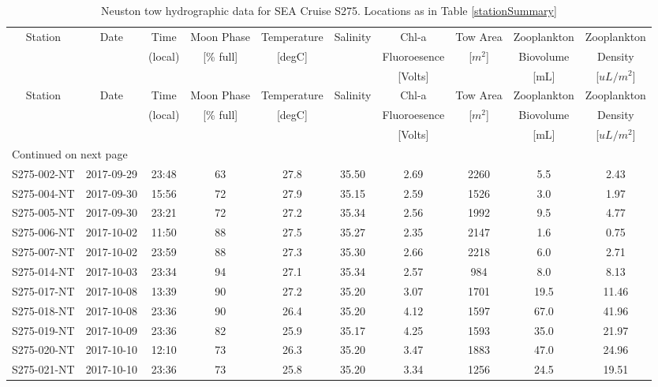 \begin{longtable}{cccccccccc}
\caption{\label{neuston1} Neuston tow hydrographic data for SEA Cruise S275. Locations as in Table \ref{stationSummary}} \\ 
 Station & Date & Time & Moon Phase & Temperature & Salinity & Chl-a & Tow Area & Zooplankton & Zooplankton \\ 
   &  & (local) & [\% full] & [degC] &  & Fluoroesence & [$m^2$] & Biovolume & Density \\ 
 &  &  &  &  &  & [Volts] &  & [mL] & [$uL/m^2$] \\ 
\hline\n\endfirsthead
Station & Date & Time & Moon Phase & Temperature & Salinity & Chl-a & Tow Area & Zooplankton & Zooplankton \\ 
 &  & (local) & [\% full] & [degC] &  & Fluoroesence & [$m^2$] & Biovolume & Density \\ 
 &  &  &  &  &  & [Volts] &  & [mL] & [$uL/m^2$] \\ 
\hline
\endhead
\hline
\multicolumn{10}{l}{\footnotesize Continued on next page}
\endfoot
\endlastfoot
 \hline
S275-001-NT & 2017-09-29 & 12:34 & 63 & 27.9 & 35.50 & 2.43 & 2439 & 2.0 & 0.82 \\ 
  S275-002-NT & 2017-09-29 & 23:48 & 63 & 27.8 & 35.50 & 2.69 & 2260 & 5.5 & 2.43 \\ 
  S275-004-NT & 2017-09-30 & 15:56 & 72 & 27.9 & 35.15 & 2.59 & 1526 & 3.0 & 1.97 \\ 
  S275-005-NT & 2017-09-30 & 23:21 & 72 & 27.2 & 35.34 & 2.56 & 1992 & 9.5 & 4.77 \\ 
  S275-006-NT & 2017-10-02 & 11:50 & 88 & 27.5 & 35.27 & 2.35 & 2147 & 1.6 & 0.75 \\ 
  S275-007-NT & 2017-10-02 & 23:59 & 88 & 27.3 & 35.30 & 2.66 & 2218 & 6.0 & 2.71 \\ 
  S275-014-NT & 2017-10-03 & 23:34 & 94 & 27.1 & 35.34 & 2.57 & 984 & 8.0 & 8.13 \\ 
  S275-017-NT & 2017-10-08 & 13:39 & 90 & 27.2 & 35.20 & 3.07 & 1701 & 19.5 & 11.46 \\ 
  S275-018-NT & 2017-10-08 & 23:36 & 90 & 26.4 & 35.20 & 4.12 & 1597 & 67.0 & 41.96 \\ 
  S275-019-NT & 2017-10-09 & 23:36 & 82 & 25.9 & 35.17 & 4.25 & 1593 & 35.0 & 21.97 \\ 
  S275-020-NT & 2017-10-10 & 12:10 & 73 & 26.3 & 35.20 & 3.47 & 1883 & 47.0 & 24.96 \\ 
  S275-021-NT & 2017-10-10 & 23:36 & 73 & 25.8 & 35.20 & 3.34 & 1256 & 24.5 & 19.51 \\ 

\end{longtable}
